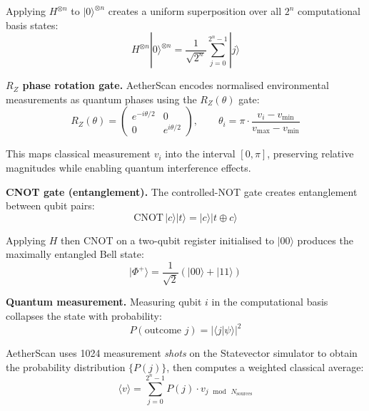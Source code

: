 \documentclass[12pt,a4paper]{article}
\newcommand{\ket}[1]{|#1\rangle}
\begin{document}
Applying $H^{\otimes n}$ to $\ket{0}^{\otimes n}$ creates a uniform
superposition over all $2^n$ computational basis states:
\begin{equation}
H^{\otimes n}\ket{0}^{\otimes n}
= \frac{1}{\sqrt{2^n}}\sum_{j=0}^{2^n-1}\ket{j}
\label{eq:hadamardall}
\end{equation}

\noindent\textbf{$R_Z$ phase rotation gate.}
AetherScan encodes normalised environmental measurements as quantum phases
using the $R_Z(\theta)$ gate:
\begin{equation}
R_Z(\theta) = \begin{pmatrix}e^{-i\theta/2} & 0 \\ 0 & e^{i\theta/2}\end{pmatrix},
\qquad
\theta_i = \pi \cdot \frac{v_i - v_{\min}}{v_{\max} - v_{\min}}
\label{eq:rz}
\end{equation}

\noindent This maps classical measurement $v_i$ into the interval $[0,\pi]$,
preserving relative magnitudes while enabling quantum interference effects.

\noindent\textbf{CNOT gate (entanglement).}
The controlled-NOT gate creates entanglement between qubit pairs:
\begin{equation}
\mathrm{CNOT}\,\ket{c}\ket{t} = \ket{c}\ket{t \oplus c}
\label{eq:cnot}
\end{equation}

Applying $H$ then CNOT on a two-qubit register initialised to $\ket{00}$
produces the maximally entangled Bell state:
\begin{equation}
\ket{\Phi^+} = \frac{1}{\sqrt{2}}(\ket{00} + \ket{11})
\label{eq:bell}
\end{equation}

\noindent\textbf{Quantum measurement.}
Measuring qubit $i$ in the computational basis collapses the state with
probability:
\begin{equation}
P(\text{outcome } j) = |\langle j|\psi\rangle|^2
\label{eq:measurement}
\end{equation}

AetherScan uses 1024 measurement \emph{shots} on the Statevector simulator
to obtain the probability distribution $\{P(j)\}$, then computes a
weighted classical average:
\begin{equation}
\langle v \rangle = \sum_{j=0}^{2^n-1} P(j)\cdot v_{j\,\bmod\,N_{\text{sources}}}
\label{eq:weightedavg}
\end{equation}
\end{document}
